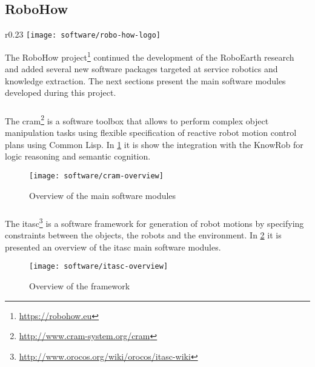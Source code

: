 \subsection{RoboHow}

\begin{wrapfigure}{r}{0.23\textwidth}
	\centering
	\vspace*{-2em}
	\texttt{[image: software/robo-how-logo]}
	\caption{RoboHow logo}
	\label{fig:robo-how-logo}
\end{wrapfigure}

The RoboHow project\footnote{\url{https://robohow.eu}} continued the development of the RoboEarth research and added several new software packages targeted at service robotics and knowledge extraction. The next sections present the main software modules developed during this project.

\subsubsection{}

The \gls{cram}\footnote{\url{http://www.cram-system.org/cram}} \cite{Beetz2010} is a software toolbox that allows to perform complex object manipulation tasks using flexible specification of reactive robot motion control plans using Common Lisp. In \cref{fig:cram-overview} it is show the integration with the KnowRob for logic reasoning and semantic cognition.

\begin{figure}[H]
	\centering
	\texttt{[image: software/cram-overview]}
	\caption{Overview of the  main software modules}
	\label{fig:cram-overview}
\end{figure}


\subsubsection{}

The \gls{itasc}\footnote{\url{http://www.orocos.org/wiki/orocos/itasc-wiki}} \cite{DeSchutter-ijrr2007} is a software framework for generation of robot motions by specifying constraints between the objects, the robots and the environment. In \cref{fig:itasc-overview} it is presented an overview of the \gls{itasc} main software modules.

\begin{figure}[H]
	\centering
	\texttt{[image: software/itasc-overview]}
	\caption[Overview of the  framework]{Overview of the  framework\protect\footnotemark}
	\label{fig:itasc-overview}
\end{figure}


